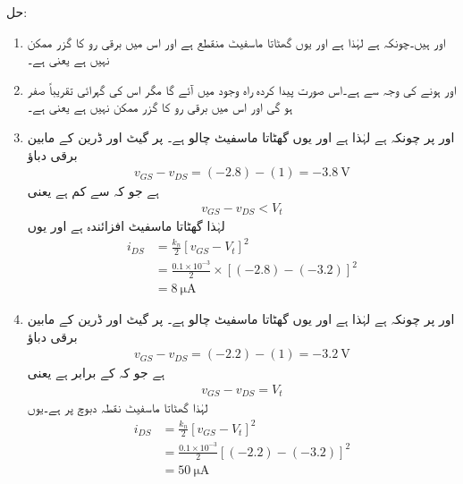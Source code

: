 حل:
\begin{enumerate}
\item
{} اور   ہیں۔چونکہ   ہے لہٰذا  ہے اور یوں گھٹاتا ماسفیٹ منقطع ہے اور اس میں برقی رو کا گزر ممکن نہیں ہے یعنی  ہے۔
\item
{} اور   ہونے کی وجہ سے  ہے۔اس صورت پیدا کردہ راہ وجود میں آئے گا مگر اس کی گہرائی تقریباً صفر ہو گی اور اس میں برقی رو کا گزر ممکن نہیں ہے یعنی   ہے۔

\item

 اور  	 پر چونکہ   ہے لہٰذا  ہے اور یوں گھٹاتا ماسفیٹ چالو ہے۔  پر گیٹ اور ڈرین کے مابین برقی دباؤ
\begin{align*}
v_{GS}-v_{DS}=(-2.8)-(1)=\SI{-3.8}{\volt}
\end{align*}
ہے جو کہ   سے کم ہے یعنی
\begin{align*}
v_{GS}-v_{DS}<V_t
\end{align*}
لہٰذا گھٹاتا ماسفیٹ افزائندہ ہے اور یوں
\begin{align*}
i_{DS}&=\frac{k_n}{2} \left[v_{GS}-V_t \right]^2 \\
&=\frac{0.1 \times 10^{-3}}{2} \times \left[(-2.8)-(-3.2) \right]^{2}\\
&=\SI{8}{\micro \ampere}
\end{align*}
\item
{} اور  	 پر چونکہ    ہے لہٰذا  ہے اور یوں گھٹاتا ماسفیٹ چالو ہے۔  پر گیٹ اور ڈرین کے مابین برقی دباؤ
\begin{align*}
v_{GS}-v_{DS}=(-2.2)-(1)=\SI{-3.2}{\volt}
\end{align*}
ہے جو کہ  کے برابر ہے  یعنی
\begin{align*}
v_{GS}-v_{DS}=V_t
\end{align*}
لہٰذا گھٹاتا ماسفیٹ نقطہ دبوچ پر ہے۔یوں
\begin{align*}
i_{DS}&=\frac{k_n}{2} \left[v_{GS}-V_t \right ]^2  \\
&=\frac{0.1 \times 10^{-3}}{2} \left[(-2.2)-(-3.2) \right ]^2 \\
&=\SI{50}{\micro \ampere}
\end{align*}

\end{enumerate}

